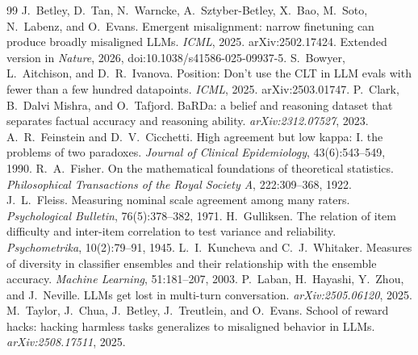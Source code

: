 \documentclass{article}
\begin{document}

\begin{thebibliography}{99}
 J.~Betley, D.~Tan, N.~Warncke,
A.~Sztyber-Betley, X.~Bao, M.~Soto, N.~Labenz, and O.~Evans. Emergent misalignment: narrow
finetuning can produce broadly misaligned LLMs. \emph{ICML}, 2025. arXiv:2502.17424. Extended
version in \emph{Nature}, 2026, doi:10.1038/s41586-025-09937-5.
 S.~Bowyer, L.~Aitchison, and D.~R.~Ivanova.
Position: Don't use the CLT in LLM evals with fewer than a few hundred datapoints. \emph{ICML},
2025. arXiv:2503.01747.
 P.~Clark, B.~Dalvi Mishra, and O.~Tafjord. BaRDa: a
belief and reasoning dataset that separates factual accuracy and reasoning ability.
\emph{arXiv:2312.07527}, 2023.
 A.~R.~Feinstein and D.~V.~Cicchetti.
High agreement but low kappa: I. the problems of two paradoxes. \emph{Journal of Clinical
Epidemiology}, 43(6):543--549, 1990.
 R.~A.~Fisher. On the mathematical foundations of
theoretical statistics. \emph{Philosophical Transactions of the Royal Society A}, 222:309--368,
1922.
 J.~L.~Fleiss. Measuring nominal scale agreement among
many raters. \emph{Psychological Bulletin}, 76(5):378--382, 1971.
 H.~Gulliksen. The relation of item difficulty and
inter-item correlation to test variance and reliability. \emph{Psychometrika}, 10(2):79--91, 1945.
 L.~I.~Kuncheva and C.~J.~Whitaker.
Measures of diversity in classifier ensembles and their relationship with the ensemble accuracy.
\emph{Machine Learning}, 51:181--207, 2003.
 P.~Laban, H.~Hayashi, Y.~Zhou, and J.~Neville. LLMs get
lost in multi-turn conversation. \emph{arXiv:2505.06120}, 2025.
 M.~Taylor, J.~Chua, J.~Betley, J.~Treutlein,
and O.~Evans. School of reward hacks: hacking harmless tasks generalizes to misaligned
behavior in LLMs. \emph{arXiv:2508.17511}, 2025.
\end{thebibliography}

\newpage

\end{document}
